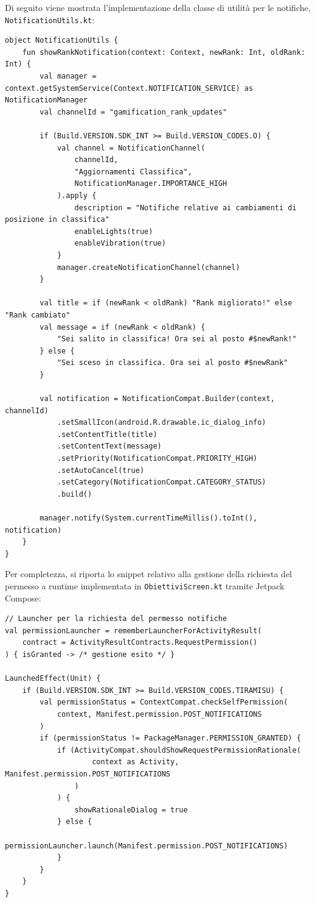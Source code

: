 \documentclass[a4paper,12pt]{report}
\begin{document}
    Di seguito viene mostrata l'implementazione della classe di utilità per le notifiche, \texttt{NotificationUtils.kt}:

    \begin{lstlisting}
object NotificationUtils {
    fun showRankNotification(context: Context, newRank: Int, oldRank: Int) {
        val manager = context.getSystemService(Context.NOTIFICATION_SERVICE) as NotificationManager
        val channelId = "gamification_rank_updates"
        
        if (Build.VERSION.SDK_INT >= Build.VERSION_CODES.O) {
            val channel = NotificationChannel(
                channelId, 
                "Aggiornamenti Classifica", 
                NotificationManager.IMPORTANCE_HIGH
            ).apply {
                description = "Notifiche relative ai cambiamenti di posizione in classifica"
                enableLights(true)
                enableVibration(true)
            }
            manager.createNotificationChannel(channel)
        }
        
        val title = if (newRank < oldRank) "Rank migliorato!" else "Rank cambiato"
        val message = if (newRank < oldRank) {
            "Sei salito in classifica! Ora sei al posto #$newRank!"
        } else {
            "Sei sceso in classifica. Ora sei al posto #$newRank"
        }
        
        val notification = NotificationCompat.Builder(context, channelId)
            .setSmallIcon(android.R.drawable.ic_dialog_info)
            .setContentTitle(title)
            .setContentText(message)
            .setPriority(NotificationCompat.PRIORITY_HIGH)
            .setAutoCancel(true)
            .setCategory(NotificationCompat.CATEGORY_STATUS)
            .build()
            
        manager.notify(System.currentTimeMillis().toInt(), notification)
    }
}
    \end{lstlisting}

    Per completezza, si riporta lo snippet relativo alla gestione della richiesta del permesso a runtime implementata in \texttt{ObiettiviScreen.kt} tramite Jetpack Compose:

    \begin{lstlisting}
// Launcher per la richiesta del permesso notifiche
val permissionLauncher = rememberLauncherForActivityResult(
    contract = ActivityResultContracts.RequestPermission()
) { isGranted -> /* gestione esito */ }

LaunchedEffect(Unit) {
    if (Build.VERSION.SDK_INT >= Build.VERSION_CODES.TIRAMISU) {
        val permissionStatus = ContextCompat.checkSelfPermission(
            context, Manifest.permission.POST_NOTIFICATIONS
        )
        if (permissionStatus != PackageManager.PERMISSION_GRANTED) {
            if (ActivityCompat.shouldShowRequestPermissionRationale(
                    context as Activity, Manifest.permission.POST_NOTIFICATIONS
                )
            ) {
                showRationaleDialog = true
            } else {
                permissionLauncher.launch(Manifest.permission.POST_NOTIFICATIONS)
            }
        }
    }
}
    \end{lstlisting}
\end{document}
